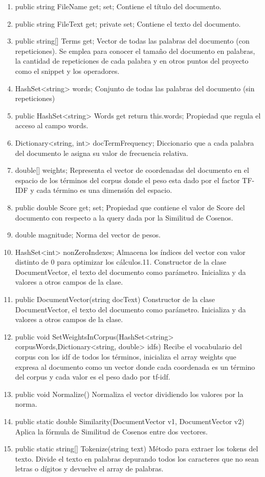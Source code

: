 \documentclass[a4paper,12pt]{article}
\begin{document}
\begin{enumerate}
    \item public string FileName {get; set; }
    Contiene el título del documento.
    \item public string FileText {get; private set; }
    Contiene el texto del documento.
    \item public string[] Terms{ get;}
    Vector de todas las palabras del documento (con repeticiones). Se emplea para conocer el
    tamaño del documento en palabras, la cantidad de repeticiones de cada palabra y en otros puntos
    del proyecto como el snippet y los operadores.
    \item HashSet<string> words;
    Conjunto de todas las palabras del documento (sin repeticiones)
    \item public HashSet<string> Words { get { return this.words; } }
    Propiedad que regula el acceso al campo words.
    \item Dictionary<string, int> docTermFrequency;
    Diccionario que a cada palabra del documento le asigna su valor de frecuencia relativa.
    \item double[] weights;
    Representa el vector de coordenadas del documento en el espacio de los términos del corpus
    donde el peso esta dado por el factor TF-IDF y cada término es una dimensión del espacio.
    \item public double Score { get; set; }
    Propiedad que contiene el valor de Score del documento con respecto a la query dada por la
    Similitud de Cosenos.
    \item double magnitude;
    Norma del vector de pesos.
    \item HashSet<int> nonZeroIndexes;
    Almacena los índices del vector con valor distinto de 0 para optimizar los cálculos.11. Constructor de la clase 
    DocumentVector, el texto del documento como parámetro. Inicializa y da
    valores a otros campos de la clase.
    \item public DocumentVector(string docText) {}
    Constructor de la clase DocumentVector, el texto del documento como parámetro. Inicializa y da
    valores a otros campos de la clase.
    \item public void SetWeightsInCorpus(HashSet<string> corpusWords,Dictionary<string, double> idfs) {}
     Recibe el vocabulario del corpus con los idf de todos los términos, inicializa el array weights que
    expresa al documento como un vector donde cada coordenada es un término del corpus y cada
    valor es el peso dado por tf-idf.
    \item public void Normalize() {}
    Normaliza el vector dividiendo los valores por la norma.
    \item public static double Similarity(DocumentVector v1, DocumentVector v2){}
    Aplica la fórmula de Similitud de Cosenos entre dos vectores.
    \item public static string[] Tokenize(string text) {}
    Método para extraer los tokens del texto. Divide el texto en palabras depurando todos los
    caracteres que no sean letras o dígitos y devuelve el array de palabras.
\end{enumerate}
    
\end{document}
